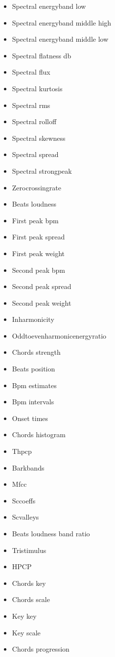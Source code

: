 \begin{itemize}
\item Spectral energyband low
\item Spectral energyband middle high
\item Spectral energyband middle low
\item Spectral flatness db
\item Spectral flux
\item Spectral kurtosis
\item Spectral rms
\item Spectral rolloff
\item Spectral skewness
\item Spectral spread
\item Spectral strongpeak
\item Zerocrossingrate
\item Beats loudness
\item First peak bpm
\item First peak spread
\item First peak weight
\item Second peak bpm
\item Second peak spread
\item Second peak weight
\item Inharmonicity
\item Oddtoevenharmonicenergyratio
\item Chords strength
\item Beats position
\item Bpm estimates
\item Bpm intervals
\item Onset times
\item Chords histogram
\item Thpcp
\item Barkbands
\item Mfcc
\item Sccoeffs
\item Scvalleys
\item Beats loudness band ratio
\item Tristimulus
\item HPCP
\item Chords key
\item Chords scale
\item Key key
\item Key scale
\item Chords progression


\end{itemize}